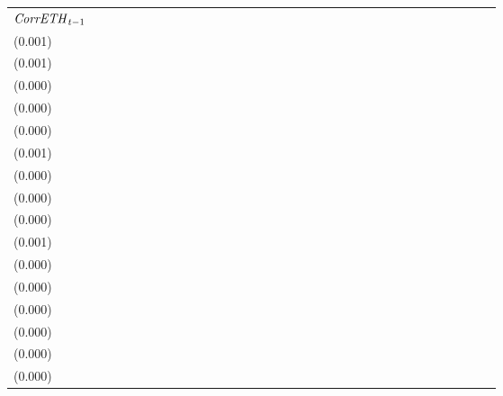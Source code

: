 \begin{tabular}{lllllllllllllllllllllllllllllllll}
${{\it CorrETH}}_{t-1}$      &  \makecell{$-0.004^{**}$ \\(0.001)} &                                     &     \makecell{$0.001^{}$ \\(0.001)} &                                     &    \makecell{$0.000^{}$ \\(0.000)} &                                    &    \makecell{$0.001^{*}$ \\(0.000)} &                                     &  \makecell{$-0.002^{**}$ \\(0.000)} &                                     &   \makecell{$0.004^{**}$ \\(0.001)} &                                     &    \makecell{$-0.000^{}$ \\(0.000)} &                                     &    \makecell{$0.001^{*}$ \\(0.000)} &                                     &  \makecell{$-0.001^{**}$ \\(0.000)} &                                     &   \makecell{$0.004^{**}$ \\(0.001)} &                                     &    \makecell{$-0.000^{}$ \\(0.000)} &                                     &    \makecell{$0.000^{}$ \\(0.000)} &                                    &  \makecell{$-0.003^{**}$ \\(0.000)} &                                     &  \makecell{$-0.001^{**}$ \\(0.000)} &                                    &    \makecell{$0.000^{}$ \\(0.000)} &                                    &   \makecell{$-0.000^{}$ \\(0.000)} &                                    \\

\end{tabular}
